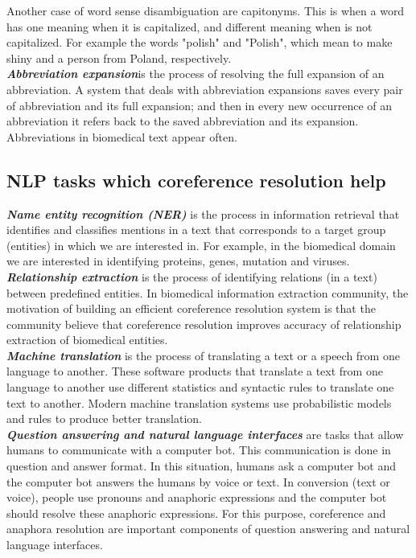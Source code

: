 Another case of word sense disambiguation are capitonyms. This is when a word has one meaning when it is capitalized, and different meaning when is not capitalized. For example the words "polish" and "Polish", which mean to make shiny and a person from Poland, respectively. \\

\emph{\textbf{Abbreviation expansion}}is the process of resolving the full expansion of an abbreviation. A system that deals with abbreviation expansions saves every pair of abbreviation and its full expansion; and then in every new occurrence of an abbreviation it refers back to the saved abbreviation and its expansion. Abbreviations in biomedical text appear often. \\

\subsection{NLP tasks which coreference resolution help}

\emph {\textbf{ Name entity recognition (NER)}} is the process in information retrieval that identifies and classifies mentions in a text that corresponds to a target group (entities) in which we are interested in. For example, in the biomedical domain we are interested in identifying proteins, genes, mutation and viruses. \\

\emph{\textbf{Relationship extraction}} is the process of identifying relations (in a text) between predefined entities. In biomedical information extraction community, the motivation of building an efficient coreference resolution system is that the community believe that coreference resolution improves accuracy of relationship extraction of biomedical entities. \\

\emph{\textbf{Machine translation}} is the process of translating a text or a speech from one language to another. These software products that translate a text from one language to another use different statistics and syntactic rules to translate one text to another. Modern machine translation systems use probabilistic models and rules to produce better translation. \\

\emph{\textbf{Question answering and natural language interfaces}} are tasks that allow humans to communicate with a computer bot. This communication is done in question and answer format. In this situation, humans ask a computer bot and the computer bot answers the humans by voice or text. In conversion (text or voice), people use pronouns and anaphoric expressions and the computer bot should resolve these anaphoric expressions. For this purpose, coreference and anaphora resolution are important components of question answering and natural language interfaces.\\ 

